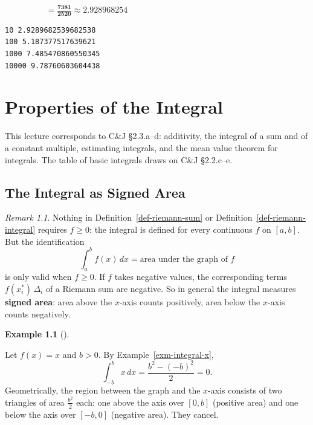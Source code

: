 \documentclass[
  letterpaper,
  DIV=11,
  numbers=noendperiod]{scrreprt}
\theoremstyle{plain}
\theoremstyle{plain}
\theoremstyle{definition}
\theoremstyle{definition}
\theoremstyle{definition}
\newtheorem{example}{Example}[chapter]
\theoremstyle{plain}
\theoremstyle{plain}
\theoremstyle{remark}
\newtheorem{refremark}{Remark}[chapter]
\begin{document}
$\displaystyle \phantom{RS(P, S)} = \mathbf{\frac{7381}{2520} \approx 2.928968254}$

\begin{verbatim}
10 2.9289682539682538
100 5.187377517639621
1000 7.485470860550345
10000 9.78760603604438
\end{verbatim}

\chapter{Properties of the Integral}\label{properties-of-the-integral}

\begin{tcolorbox}[enhanced jigsaw, arc=.35mm, bottomrule=.15mm, bottomtitle=1mm, breakable, colback=white, colbacktitle=quarto-callout-note-color!10!white, colframe=quarto-callout-note-color-frame, coltitle=black, left=2mm, leftrule=.75mm, opacityback=0, opacitybacktitle=0.6, rightrule=.15mm, title={Companion reading}, titlerule=0mm, toprule=.15mm, toptitle=1mm]

This lecture corresponds to C\&J §2.3.a--d: additivity, the integral of
a sum and of a constant multiple, estimating integrals, and the mean
value theorem for integrals. The table of basic integrals draws on C\&J
§2.2.c--e.

\end{tcolorbox}

\section{The Integral as Signed Area}\label{the-integral-as-signed-area}

\begin{refremark}
Nothing in Definition~\ref{def-riemann-sum} or
Definition~\ref{def-riemann-integral} requires \(f\ge0\): the integral
is defined for every continuous \(f\) on \([a,b]\). But the
identification \[
\int_a^b f(x)\,dx = \text{area under the graph of } f
\] is only valid when \(f\ge 0\). If \(f\) takes negative values, the
corresponding terms \(f(x_i^*)\,\Delta_i\) of a Riemann sum are
negative. So in general the integral measures \textbf{signed area}: area
above the \(x\)-axis counts positively, area below the \(x\)-axis counts
negatively.

\label{rem-signed-area}

\end{refremark}

\begin{example}[]\protect\hypertarget{exm-integral-x-symmetric}{}\label{exm-integral-x-symmetric}

\hfill\break
Let \(f(x)=x\) and \(b>0\). By Example~\ref{exm-integral-x}, \[
\int_{-b}^{b} x\,dx = \frac{b^2-(-b)^2}{2} = 0 .
\] Geometrically, the region between the graph and the \(x\)-axis
consists of two triangles of area \(\tfrac{b^2}{2}\) each: one above the
axis over \([0,b]\) (positive area) and one below the axis over
\([-b,0]\) (negative area). They cancel.

\end{example}
\end{document}
